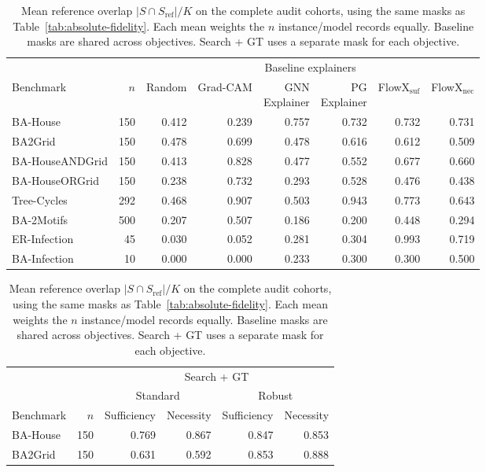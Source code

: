 \begin{table}[htbp]
\caption{Mean reference overlap $|S\cap S_{\mathrm{ref}}|/K$ on the complete
audit cohorts, using the same masks as Table~\ref{tab:absolute-fidelity}.
Each mean weights the $n$ instance/model records equally.
Baseline masks are shared across objectives. Search + GT uses a separate
mask for each objective.}
\label{tab:reference-overlap}
\centering
\scriptsize
\setlength{\tabcolsep}{3pt}
\begin{tabular*}{\textwidth}{@{\extracolsep{\fill}}lr rrrrrr@{}}
\toprule
& & \multicolumn{6}{c}{Baseline explainers}\\
\cmidrule(l){3-8}
Benchmark & $n$ & Random & Grad-CAM & \shortstack{GNN\\Explainer}
& \shortstack{PG\\Explainer} & FlowX$_{\mathrm{suf}}$ & FlowX$_{\mathrm{nec}}$\\
\midrule
BA-House & 150 & 0.412 & 0.239 & 0.757 & 0.732 & 0.732 & 0.731 \\
BA2Grid & 150 & 0.478 & 0.699 & 0.478 & 0.616 & 0.612 & 0.509 \\
BA-HouseANDGrid & 150 & 0.413 & 0.828 & 0.477 & 0.552 & 0.677 & 0.660 \\
BA-HouseORGrid & 150 & 0.238 & 0.732 & 0.293 & 0.528 & 0.476 & 0.438 \\
\addlinespace
Tree-Cycles & 292 & 0.468 & 0.907 & 0.503 & 0.943 & 0.773 & 0.643 \\
BA-2Motifs & 500 & 0.207 & 0.507 & 0.186 & 0.200 & 0.448 & 0.294 \\
ER-Infection & 45 & 0.030 & 0.052 & 0.281 & 0.304 & 0.993 & 0.719 \\
BA-Infection & 10 & 0.000 & 0.000 & 0.233 & 0.300 & 0.300 & 0.500 \\
\bottomrule
\end{tabular*}
\par\vspace{6pt}
\begin{tabular*}{\textwidth}{@{\extracolsep{\fill}}lr rrrr@{}}
\toprule
& & \multicolumn{4}{c}{Search + GT}\\
\cmidrule(l){3-6}
& & \multicolumn{2}{c}{Standard} & \multicolumn{2}{c}{Robust}\\
\cmidrule(lr){3-4}\cmidrule(l){5-6}
Benchmark & $n$ & Sufficiency & Necessity & Sufficiency & Necessity\\
\midrule
BA-House & 150 & 0.769 & 0.867 & 0.847 & 0.853 \\
BA2Grid & 150 & 0.631 & 0.592 & 0.853 & 0.888 \\

\end{tabular*}
\end{table}
